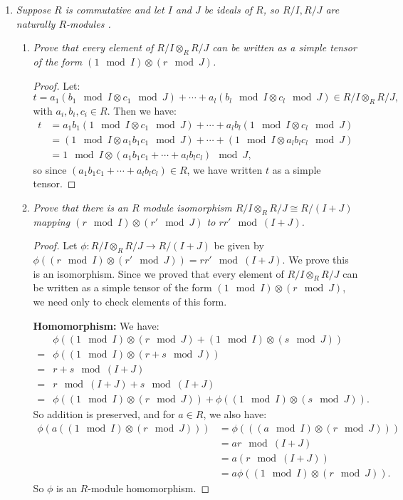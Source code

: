 \documentclass[10pt,oneside,reqno]{amsart}
\theoremstyle{plain}
\theoremstyle{definition}
\theoremstyle{remark}
\newcommand{\z}{\mathbb{Z}}
\newcommand{\Q}{\mathbb{Q}}
\newcommand{\bee}{\begin{equation}\begin{aligned}}
\newcommand{\eee}{\end{aligned}\end{equation}}
\newcommand{\tens}{\otimes}
\begin{document}
\begin{enumerate}[label=\arabic*.]
\begin{comment}
Example: $R = \z,M = \Q,N_i = \z_{2^i},i = 1,2,...$ Consider:
$$
\Q \tens \left(\prod_{i = 1}^\infty \z_{2^i} \right) \neq 0,
$$
by 8.  But note:
$$
\prod_{i  =1}^\infty\left(\Q \tens \z_{2^i} \right) = 0. 
$$
\end{comment}

\item \textit{Suppose $R$ is commutative and let $I$ and $J$ be ideals of $R$, so $R/I,R/J$ are naturally $R$-modules . }

\begin{enumerate}
\item \textit{Prove that every element of $R/I \tens_R R/J$ can be written as a simple tensor of the form $(1 \mod I) \tens (r \mod J)$. }

\begin{proof}
Let:
 $$
 t = a_1(b_1 \mod I \otimes c_1 \mod J) + \cdots + a_l(b_l\mod I \otimes c_l\mod J)  \in R/I \tens_R R/J,
 $$
 with $a_i,b_i,c_i \in R$. Then we have: 
 \bee
 t &= a_1b_1(1 \mod I \otimes c_1 \mod J) + \cdots + a_lb_l(1 \mod I \otimes c_l\mod J)\\
 &= (1 \mod I \otimes a_1b_1c_1 \mod J) + \cdots + (1 \mod I \otimes a_lb_lc_l\mod J)\\
 &= 1 \mod I \tens (a_1b_1c_1 + \cdots + a_lb_lc_l) \mod J,
 \eee
 so since $(a_1b_1c_1 + \cdots + a_lb_lc_l) \in R$, we have written $t$ as a simple tensor. 
\end{proof}

\item \textit{Prove that there is an $R$ module isomorphism $R/I \tens_R R/J \cong R/(I + J)$ mapping $(r \mod I) \tens (r' \mod J)$ to $rr' \mod (I + J)$. }

\begin{proof}
Let $\phi: R/I \tens_R R/J \to R/(I + J)$ be given by $\phi((r \mod I) \tens (r' \mod J)) = rr' \mod (I + J)$. We prove this is an isomorphism. Since we proved that every element of $ R/I \tens_R R/J$ can be written as a simple tensor of the form $(1 \mod I) \tens (r \mod J)$, we need only to check elements of this form.

\textbf{Homomorphism: } We have: 
\bee
&\phi((1 \mod I) \tens (r \mod J) + (1 \mod I) \tens (s \mod J))\\
=&\phi((1 \mod I) \tens (r + s \mod J))\\
=&r + s \mod (I + J)\\
=&r \mod (I + J) + s \mod (I+ J)\\
=&\phi((1 \mod I) \tens (r \mod J)) + \phi((1 \mod I) \tens (s \mod J)).
\eee
So addition is preserved, and for $a \in R$, we also have: 
\bee
\phi(a((1 \mod I) \tens (r \mod J))) &= \phi(((a \mod I) \tens (r \mod J)))\\
&= ar \mod (I + J)\\
&= a(r \mod (I + J))\\
&= a \phi((1 \mod I) \tens (r \mod J)).
\eee
So $\phi$ is an $R$-module homomorphism. 


\end{proof}
\end{enumerate}
\end{enumerate}
\end{document}
